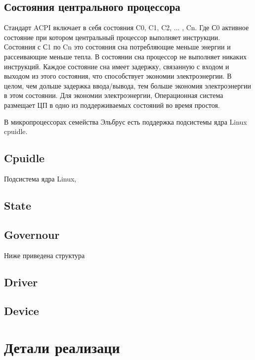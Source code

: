 \documentclass{article}
\begin{document}
\subsection{Состояния центрального процессора}

Стандарт ACPI включает в себя состояния C0, C1, C2, ... , Cn. Где С0 активное состояние при котором центральный процессор выполняет инструкции. Состояния с С1 по Cn это состояния сна потребляющие меньше энергии и рассеивающие меньше тепла. В состоянии сна процессор не выполняет никаких инструкций. Каждое состояние сна имеет задержку, связанную с входом и выходом из этого состояния, что способствует экономии электроэнергии. В целом, чем дольше задержка ввода/вывода, тем больше экономия электроэнергии в этом состоянии. Для экономии электроэнергии, Операционная система размещает ЦП в одно из поддерживаемых состояний во время простоя.

В микропроцессорах семейства Эльбрус есть поддержка подсистемы ядра Linux cpuidle.


\subsection{Cpuidle}

Подсистема ядра Linux, 

\subsection{State}


\subsection{Governour}
Ниже приведена структура 


\subsection{Driver}


\subsection{Device}







\newpage
\section{Детали реализаци}
\end{document}
